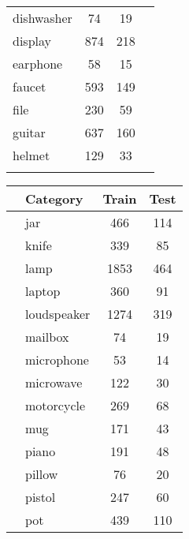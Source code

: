\begin{table}[]
\begin{tabular}[t]{lccl}
		dishwasher         & 74             & 19            &              \\
		display            & 874            & 218           &              \\
		earphone           & 58             & 15            &              \\
		faucet             & 593            & 149           &              \\
		file               & 230            & 59            &              \\
		guitar             & 637            & 160           &              \\
		helmet             & 129            & 33            &              \\ \hline
		                   &                &
	\end{tabular}
	\begin{tabular}[t]{llcc}
		\hline
		\hspace{4pt} & \textbf{Category} & \textbf{Train} & \textbf{Test}  \\ \hline
		             & jar               & 466            & 114            \\
		             & knife             & 339            & 85             \\
		             & lamp              & 1853           & 464            \\
		             & laptop            & 360            & 91             \\
		             & loudspeaker       & 1274           & 319            \\
		             & mailbox           & 74             & 19             \\
		             & microphone        & 53             & 14             \\
		             & microwave         & 122            & 30             \\
		             & motorcycle        & 269            & 68             \\
		             & mug               & 171            & 43             \\
		             & piano             & 191            & 48             \\
		             & pillow            & 76             & 20             \\
		             & pistol            & 247            & 60             \\
		             & pot               & 439            & 110            \\

\end{tabular}
\end{table}
